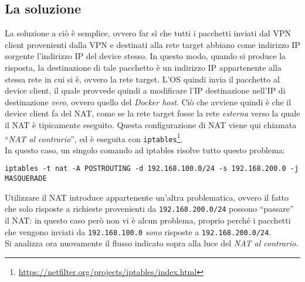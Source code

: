 \subsection{La soluzione}
La soluzione a ciò è semplice, ovvero far sì che tutti i pacchetti inviati dal
VPN client provenienti dalla VPN e destinati alla rete target abbiano come
indirizzo IP sorgente l'indirizzo IP del device stesso. In questo modo, quando si
produce la risposta, la destinazione di tale pacchetto è un indirizzo IP appartenente
alla stessa rete in cui si è, ovvero la rete target. L'OS quindi invia il
pacchetto al device client, il quale provvede quindi a modificare
l'IP destinazione nell'IP di destinazione \textit{vero}, ovvero quello del \textit{Docker host}.
Ciò che avviene quindi è che il device client fa del NAT, come se la rete target
fosse la rete \textit{esterna} verso la quale il NAT è tipicamente eseguito. Questa
configurazione di NAT viene qui chiamata ``\textit{NAT al contrario}'', ed è eseguita con
\texttt{iptables}\footnote{\url{https://netfilter.org/projects/iptables/index.html}}.\\
In questo caso, un singolo comando ad iptables risolve tutto questo problema:
\begin{verbatim}
iptables -t nat -A POSTROUTING -d 192.168.100.0/24 -s 192.168.200.0 -j MASQUERADE
\end{verbatim}
Utilizzare il NAT introduce appartenente un'altra problematica, ovvero il fatto che
solo risposte a richieste provenienti da \texttt{192.168.200.0/24} possono ``passare''
il NAT: in questo caso però non vi è alcun problema, proprio perché i pacchetti che
vengono inviati da \texttt{192.168.100.0} \textit{sono} risposte a
\texttt{192.168.200.0/24}.\\
Si analizza ora nuovamente il flusso indicato sopra alla luce del \textit{NAT al contrario}.
